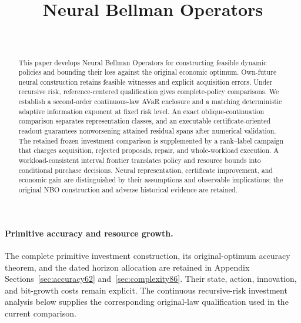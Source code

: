 \documentclass[ecta,nameyear,draft]{econsocart}
\begin{document}
\begin{frontmatter}
\title{Neural Bellman Operators}
\begin{aug}
\author[id=au1,addressref={add1}]{~}
\address[id=add1]{Peking University}
\end{aug}
\begin{abstract}
This paper develops Neural Bellman Operators for constructing feasible dynamic policies and bounding their loss against the original economic optimum. Own-future neural construction retains feasible witnesses and explicit acquisition errors. Under recursive risk, reference-centered qualification gives complete-policy comparisons. We establish a second-order continuous-law AVaR enclosure and a matching deterministic adaptive information exponent at fixed risk level. An exact oblique-continuation comparison separates representation classes, and an executable certificate-oriented readout guarantees nonworsening attained residual spans after numerical validation. The retained frozen investment comparison is supplemented by a rank--label campaign that charges acquisition, rejected proposals, repair, and whole-workload execution. A workload-consistent interval frontier translates policy and resource bounds into conditional purchase decisions. Neural representation, certificate improvement, and economic gain are distinguished by their assumptions and observable implications; the original NBO construction and adverse historical evidence are retained.
\end{abstract}
\begin{keyword}
\end{keyword}
\end{frontmatter}


\paragraph{Primitive accuracy and resource growth.}
The complete primitive investment construction, its original-optimum accuracy theorem, and the dated horizon allocation are retained in Appendix Sections~\ref{sec:accuracy62} and~\ref{sec:complexity86}. Their state, action, innovation, and bit-growth costs remain explicit. The continuous recursive-risk investment analysis below supplies the corresponding original-law qualification used in the current comparison.












\end{document}
